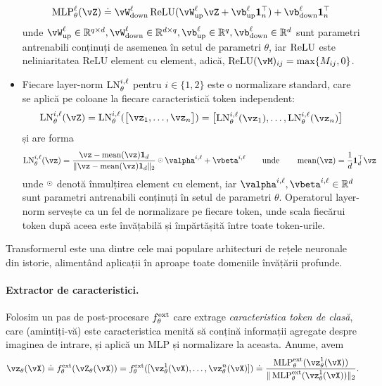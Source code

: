 \documentclass[../../book-main_ro.tex]{subfiles}
\begin{document}
\begin{itemize}
    \begin{equation}
        \MLP_{\theta}^{\ell}(\vZ) \doteq \vW_{\down}^{\ell}\ReLU(\vW_{\up}^{\ell}\vZ + \vb_{\up}^{\ell}\vone_{n}^{\top}) + \vb_{\down}^{\ell}\vone_{n}^{\top}
    \end{equation}
    unde \(\vW_{\up}^{\ell} \in \R^{q \times d}, \vW_{\down}^{\ell} \in \R^{d \times q}, \vb_{\up}^{\ell} \in \R^{q}, \vb_{\down}^{\ell} \in \R^{d}\) sunt parametri antrenabili conținuți de asemenea în setul de parametri \(\theta\), iar \(\operatorname{ReLU}\) este neliniaritatea ReLU element cu element, adică, \(\ReLU(\vM)_{ij} = \max\{M_{ij}, 0\}\). 
    \item Fiecare layer-norm \(\operatorname{LN}_{\theta}^{i, \ell}\) pentru \(i \in \{1, 2\}\) este o normalizare standard, care se aplică pe coloane la fiecare caracteristică token independent:
    \begin{equation}
        \LN_{\theta}^{i, \ell}(\vZ) = \LN_{\theta}^{i, \ell}(\mat{\vz_{1}, \dots, \vz_{n}}) = \mat{\LN_{\theta}^{i, \ell}(\vz_{1}), \dots, \LN_{\theta}^{i, \ell}(\vz_{n})}
    \end{equation}
    și are forma 
    \begin{equation}
        \LN_{\theta}^{i, \ell}(\vz) = \frac{\vz
        - \operatorname{mean}(\vz)\vone_{d}}{\norm{\vz
        - \operatorname{mean}(\vz)\vone_{d}}_{2}} \hada \valpha^{i, \ell} + \vbeta^{i, \ell} \qquad \text{unde} \qquad \operatorname{mean}(\vz) = \frac{1}{d}\vone_{d}^{\top}\vz
    \end{equation}
    unde \(\hada\) denotă înmulțirea element cu element, iar \(\valpha^{i, \ell}, \vbeta^{i, \ell} \in \R^{d}\) sunt parametri antrenabili conținuți în setul de parametri \(\theta\). Operatorul layer-norm servește ca un fel de normalizare pe fiecare token, unde scala fiecărui token după aceea este învățabilă și împărtășită între toate token-urile. 
\end{itemize}

Transformerul este una dintre cele mai populare arhitecturi de rețele neuronale din istorie, alimentând aplicații în aproape toate domeniile învățării profunde.

\paragraph{Extractor de caracteristici.} Folosim un pas de post-procesare \(f_{\theta}^{\mathrm{ext}}\) care extrage \textit{caracteristica token de clasă}, care (amintiți-vă) este caracteristica menită să conțină informații agregate despre imaginea de intrare, și aplică un MLP și normalizare la aceasta. Anume, avem 
\begin{equation}
    \vz_{\theta}(\vX) \doteq f_{\theta}^{\ext}(\vZ_{\theta}(\vX)) = f_{\theta}^{\ext}([\vz_{\theta}^{1}(\vX), \dots, \vz_{\theta}^{n}(\vX)]) \doteq \frac{\MLP_{\theta}^{\ext}(\vz_{\theta}^{1}(\vX))}{\norm{\MLP_{\theta}^{\ext}(\vz_{\theta}^{1}(\vX))}_{2}}.
\end{equation} 
\end{document}
